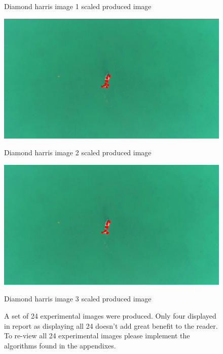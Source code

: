 \documentclass[conference]{IEEEtran}
\begin{document}
\begin{figure}[!htb]
\begin{minipage}[b]{0.2\textwidth}
    \caption{Diamond harris image 1 scaled produced image}
    \label{Diamond harris image 1 scaled produced image}
  \end{minipage}
  \hfill
  \begin{minipage}[b]{0.2\textwidth}
    \includegraphics[width=\textwidth]{../programme/results/Task_1/scaled_experiements/Harris/dugong/image_2.jpg}
    \caption{Diamond harris image 2 scaled produced image}
    \label{Diamond harris image 2 scaled produced image}
  \end{minipage}
  \hfill
    \begin{minipage}[b]{0.2\textwidth}
    \includegraphics[width=\textwidth]{../programme/results/Task_1/scaled_experiements/Harris/dugong/image_3.jpg}
    \caption{Diamond harris image 3 scaled produced image}
    \label{Diamond harris image 3 scaled produced image}
  \end{minipage}
  {\caption*{A set of 24 experimental images were produced. Only four displayed in report as displaying all 24 doesn't add great benefit to the reader. To re-view all 24 experimental images please implement the algorithms found in the appendixes.}}
\end{figure}
\end{document}
